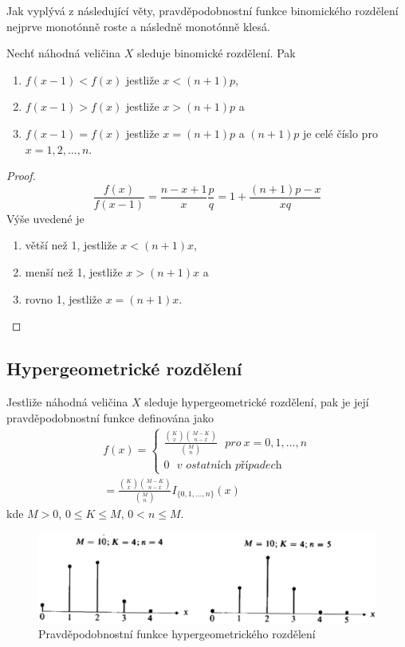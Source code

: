 Jak vyplývá z následující věty, pravděpodobnostní funkce binomického rozdělení nejprve monotónně roste a následně monotónně klesá.
\begin{theorem}
Nechť náhodná veličina $X$ sleduje binomické rozdělení. Pak
\begin{enumerate}
\item $f(x-1) < f(x)$ jestliže $x < (n + 1)p$,
\item $f(x-1) > f(x)$ jestliže $x > (n + 1)p$ a
\item $f(x-1) = f(x)$ jestliže $x = (n + 1)p$ a $(n + 1)p$ je celé číslo pro $x = 1, 2, ...,n$.
\end{enumerate}
\end{theorem}

\begin{proof}
\begin{equation*}
\frac{f(x)}{f(x-1)} = \frac{n - x + 1}{x} \frac{p}{q} = 1 + \frac{(n + 1)p - x}{xq}
\end{equation*}
Výše uvedené je
\begin{enumerate}
\item větší než 1, jestliže $x < (n + 1)x$,
\item menší než 1, jestliže $x > (n + 1)x$ a
\item rovno 1, jestliže $x = (n + 1)x$.
\end{enumerate}
\end{proof}

\subsection{Hypergeometrické rozdělení}

\begin{definition}
Jestliže náhodná veličina $X$ sleduje hypergeometrické rozdělení, pak je její pravděpodobnostní funkce definována jako
\begin{gather*}
f(x) =
\begin{cases}
\frac{\binom{K}{x}\binom{M-K}{n-x}}{\binom{M}{n}}~~~\textit{pro}~x = 0,1,...,n\\
0~~~\textit{v ostatních případech}
\end{cases}\\
= \frac{\binom{K}{x}\binom{M-K}{n-x}}{\binom{M}{n}}I_{\{0,1,...,n\}}(x)
\end{gather*}
kde $M > 0$, $0 \le K \le M$, $0 < n \le M$. 
\end{definition}

\begin{figure}[htp]
\centering
\includegraphics[scale = 0.5]{pictures/hypergeometric_distribution.eps}
\caption{Pravděpodobnostní funkce hypergeometrického rozdělení}
\label{hypergeometric_distribution}
\end{figure}

